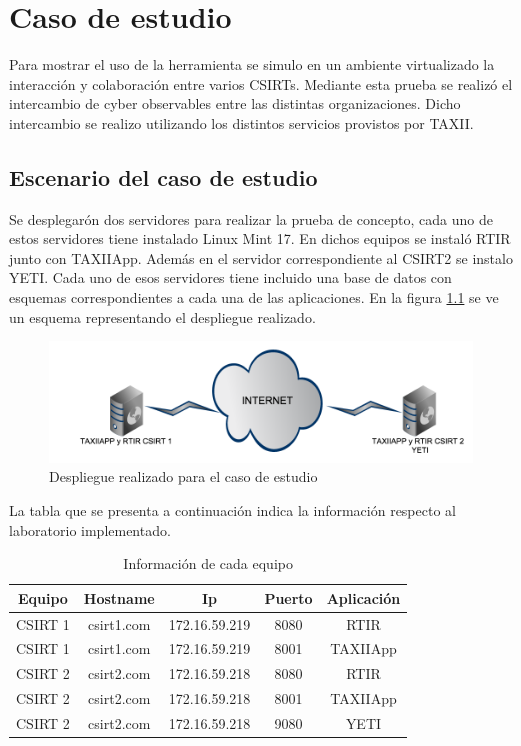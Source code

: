 \chapter{Caso de estudio}
\label{capitulo6}
Para mostrar el uso de la herramienta se simulo en un ambiente virtualizado la interacción y colaboración entre varios CSIRTs. Mediante esta prueba se realizó el intercambio de cyber observables entre las distintas organizaciones. Dicho intercambio se realizo utilizando los distintos servicios provistos por TAXII.

\section{Escenario del caso de estudio}
Se desplegarón dos servidores para realizar la prueba de concepto, cada uno de estos servidores tiene instalado Linux Mint 17. En dichos equipos se instaló RTIR junto con TAXIIApp. Además en el servidor correspondiente al CSIRT2 se instalo YETI. Cada uno de esos servidores tiene incluido una base de datos con esquemas correspondientes a cada una de las aplicaciones. En la figura \ref{fig.laboratorio_desplegado} se ve un esquema representando el despliegue realizado.

\begin{figure}[h!]
	\label{fig.laboratorio_desplegado}
	\centering
	\includegraphics[scale=0.4]{caso-de-estudio/laboratorioDesplegado.png}
	\caption{Despliegue realizado para el caso de estudio}
\end{figure}

La tabla que se presenta a continuación indica la información respecto al laboratorio implementado.
\renewcommand{\tablename}{Tabla}

\begin{table}
	\begin{center}
		\begin{tabular}{|c|c|c|c|c|}
			\hline
			Equipo & Hostname & Ip & Puerto & Aplicación \\ \hline
			CSIRT 1 & csirt1.com & 172.16.59.219 & 8080 & RTIR \\ \hline
			CSIRT 1 & csirt1.com & 172.16.59.219 & 8001 & TAXIIApp \\ \hline
			CSIRT 2 & csirt2.com & 172.16.59.218 & 8080 & RTIR \\ \hline
			CSIRT 2 & csirt2.com & 172.16.59.218 & 8001 & TAXIIApp \\ \hline
			CSIRT 2 & csirt2.com & 172.16.59.218 & 9080 & YETI \\ \hline
		\end{tabular}
	\end{center}
	\caption{Información de cada equipo}
	\label{tabla_equipos}
\end{table}

